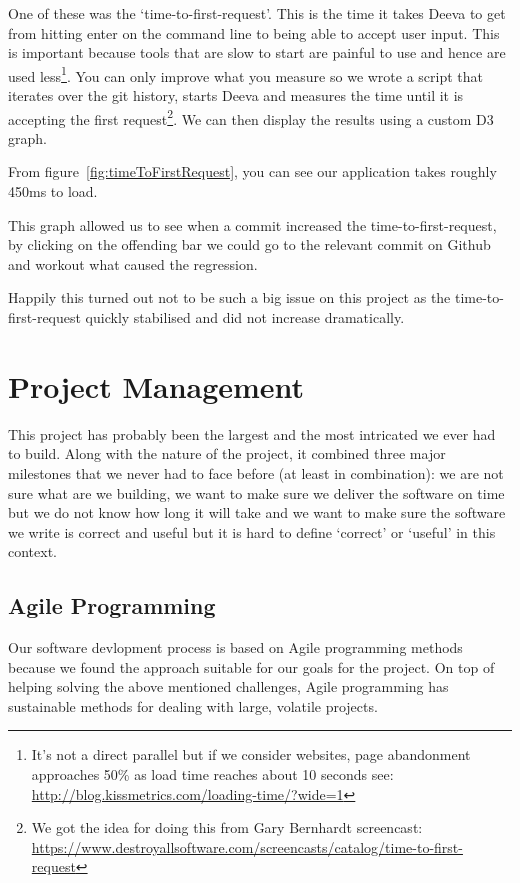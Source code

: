 \documentclass[11pt, a4paper]{article}
\begin{document}
One of these was the `time-to-first-request'.
This is the time it takes Deeva to get from hitting enter on the command line to being able to accept user input.
This is important because tools that are slow to start are painful to use and hence are used less\footnote{It's not a direct parallel but if we consider websites, page abandonment approaches 50\% as load time reaches about 10 seconds see: \url{http://blog.kissmetrics.com/loading-time/?wide=1}}.
You can only improve what you measure so we wrote a script that iterates over the git history, starts Deeva and measures the time until it is accepting the first request\footnote{We got the idea for doing this from Gary Bernhardt screencast: \url{https://www.destroyallsoftware.com/screencasts/catalog/time-to-first-request}}.
We can then display the results using a custom D3 graph.

From figure~\ref{fig:timeToFirstRequest}, you can see our application takes roughly 450ms to load.

This graph allowed us to see when a commit increased the time-to-first-request, by clicking on the offending bar we could go to the relevant commit on Github and workout what caused the regression.

Happily this turned out not to be such a big issue on this project as the time-to-first-request quickly stabilised and did not increase dramatically.

\section{Project Management}
This project has probably been the largest and the most intricated we ever had to build.
Along with the nature of the project, it combined three major milestones that we never had to face before (at least in combination): we are not sure what are we building, we want to make sure we deliver the software on time but we do not know how long it will take and we want to make sure the software we write is correct and useful but it is hard to define `correct' or `useful' in this context.

\subsection{Agile Programming}

Our software devlopment process is based on Agile programming methods because we found the approach suitable for our goals for the project. 
On top of helping solving the above mentioned challenges, Agile programming has sustainable methods for dealing with large, volatile projects.
\end{document}
